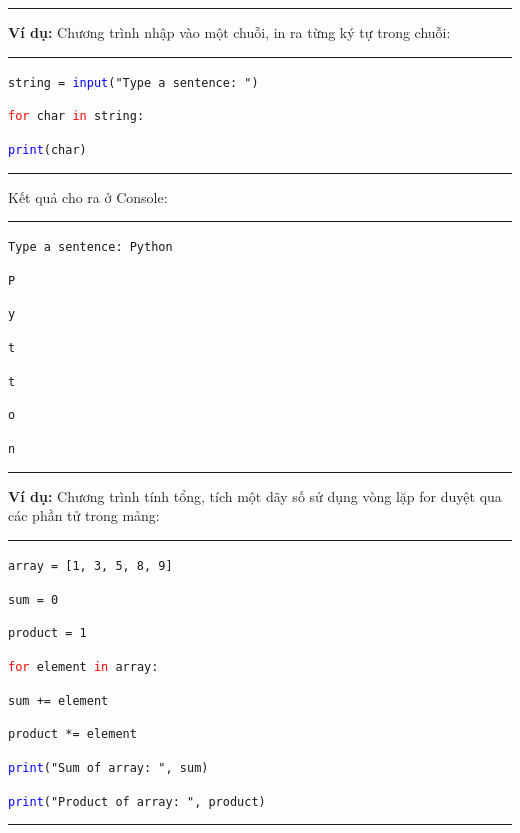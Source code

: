 \rule{\linewidth}{0.2mm}\par
\resetlinenumber
\newpage
\textbf{Ví dụ:} Chương trình nhập vào một chuỗi, in ra từng ký tự trong chuỗi:\\
\rule{\linewidth}{0.2mm}\par
\begin{linenumbers}
	\texttt{string = \textcolor{blue}{input}("Type a sentence: ")}\par
	\texttt{\textcolor{red}{for} char \textcolor{red}{in} string:}\par
	\qquad \texttt{\textcolor{blue}{print}(char)}\par
\end{linenumbers}
\rule{\linewidth}{0.2mm}\par
\noindent
\resetlinenumber
Kết quả cho ra ở Console:\\
\rule{\linewidth}{0.2mm}\par
\begin{linenumbers}
	\texttt{Type a sentence: Python}\par
	\texttt{P}\par
	\texttt{y}\par
	\texttt{t}\par
	\texttt{t}\par
	\texttt{o}\par
	\texttt{n}\par
\end{linenumbers}
\rule{\linewidth}{0.2mm}\par
\resetlinenumber
\newpage
\textbf{Ví dụ:} Chương trình tính tổng, tích một dãy số sử dụng vòng lặp for duyệt qua các phần tử trong mảng:\\
\rule{\linewidth}{0.2mm}\par
\begin{linenumbers}
	\texttt{array = [1, 3, 5, 8, 9]}\par
	\texttt{sum = 0}\par
	\texttt{product = 1}\par
	\texttt{\textcolor{red}{for} element \textcolor{red}{in} array:}\par
	\qquad \texttt{sum += element}\par
	\qquad \texttt{product *= element}\par
	\texttt{\textcolor{blue}{print}("Sum of array: ", sum)}\par
	\texttt{\textcolor{blue}{print}("Product of array: ", product)}
\end{linenumbers}
\rule{\linewidth}{0.2mm}\par
